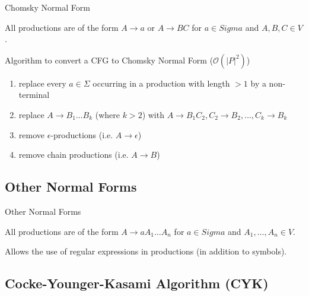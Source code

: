 \documentclass{beamer}
\begin{document}
\begin{frame}{Chomsky Normal Form}
    \begin{definition}
        All productions are of the form $A \to a$ or $A \to BC$ for $a \in Sigma$ and $A,B,C \in V$.
    \end{definition}\pause

    \begin{block}{Algorithm to convert a CFG to Chomsky Normal Form ($\mathcal{O}(|P|^2)$)}
        \begin{enumerate}
            \item replace every $a \in \Sigma$ occurring in a production with length $>1$ by a non-terminal\pause
            \item replace $A \to B_1 \dots B_k$ (where $k>2$) with $A \to B_1 C_2, C_2 \to B_2, \dots, C_k \to B_k$\pause
            \item remove $\epsilon$-productions (i.e. $A \to \epsilon$)\pause
            \item remove chain productions (i.e. $A \to B$)
        \end{enumerate}
    \end{block}
\end{frame}

\subsection{Other Normal Forms}

\begin{frame}{Other Normal Forms}
    \begin{definition}
        All productions are of the form $A \to a A_1 \dots A_n$ for $a \in Sigma$ and $A_1, \dots, A_n \in V$.
    \end{definition}\pause

    \begin{definition}
        Allows the use of regular expressions in productions (in addition to symbols).
    \end{definition}
\end{frame}

\subsection{Cocke-Younger-Kasami Algorithm (CYK)}
\end{document}
